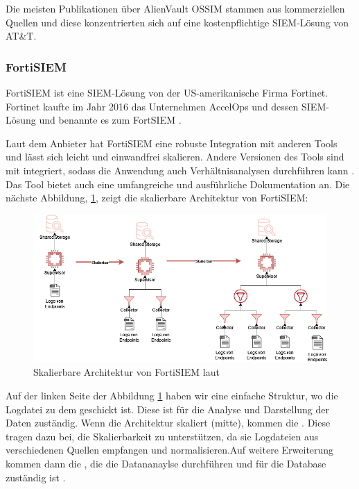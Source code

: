 
Die meisten Publikationen über AlienVault OSSIM stammen aus kommerziellen Quellen und diese konzentrierten sich auf eine kostenpflichtige \gls{SIEM}-Lösung von AT\&T.

\newpage
\subsubsection{FortiSIEM}
FortiSIEM ist eine \gls{SIEM}-Lösung von der US-amerikanische Firma Fortinet. Fortinet kaufte im Jahr 2016 das Unternehmen AccelOps und dessen \gls{SIEM}-Lösung und benannte es zum FortSIEM \citep{Fortinet_Press}.

Laut dem Anbieter hat FortiSIEM eine robuste Integration mit anderen Tools und lässt sich leicht und einwandfrei skalieren. Andere Versionen des Tools sind mit  integriert, sodass die Anwendung auch Verhältnisanalysen durchführen kann \citep{Fortinet_Solutions}. Das Tool bietet auch eine umfangreiche und ausführliche Dokumentation an. Die nächste Abbildung, \ref{fig:FortiSIEM}, zeigt die skalierbare Architektur von FortiSIEM:

\begin{figure}[H]
   \centering
   \includegraphics[width=1\textwidth]{assets/FortSIEM.drawio.png}
   \caption[Skalierbare Architektur von FortiSIEM]
   {Skalierbare Architektur von FortiSIEM laut \cite{Fortinet_Arch} }
   \label{fig:FortiSIEM}
   \centering
\end{figure}

Auf der linken Seite der Abbildung \ref{fig:FortiSIEM} haben wir eine einfache Struktur, wo die Logdatei zu dem  geschickt ist. Diese ist für die Analyse und Darstellung der Daten zuständig. Wenn die Architektur skaliert (mitte), kommen die . Diese tragen dazu bei, die Skalierbarkeit zu unterstützen, da sie Logdateien aus verschiedenen Quellen empfangen und normalisieren.Auf weitere Erweiterung kommen dann die , die die Datananaylse durchführen und für die Database zuständig ist \citep{Fortinet_Key}.

